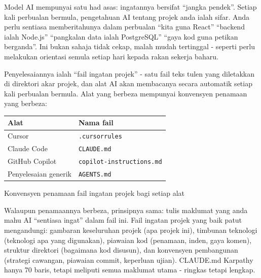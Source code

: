 


Model AI mempunyai satu had asas: ingatannya bersifat “jangka pendek”. Setiap kali perbualan bermula, pengetahuan AI tentang projek anda ialah sifar. Anda perlu sentiasa memberitahunya dalam perbualan “kita guna React” “backend ialah Node.js” “pangkalan data ialah PostgreSQL” “gaya kod guna petikan berganda”. Ini bukan sahaja tidak cekap, malah mudah tertinggal - seperti perlu melakukan orientasi semula setiap hari kepada rakan sekerja baharu.

Penyelesaiannya ialah “fail ingatan projek” - satu fail teks tulen yang diletakkan di direktori akar projek, dan alat AI akan membacanya secara automatik setiap kali perbualan bermula. Alat yang berbeza mempunyai konvensyen penamaan yang berbeza:

\begin{center}
\begin{tabularx}{\linewidth}{|X|X|}
\hline
\textbf{Alat} & \textbf{Nama fail} \tabularnewline
\hline
Cursor & \texttt{.\allowbreak cursorrules} \tabularnewline
Claude Code & \texttt{CLAUDE.\allowbreak md} \tabularnewline
GitHub Copilot & \texttt{copilot-\allowbreak instructions.\allowbreak md} \tabularnewline
Penyelesaian generik & \texttt{AGENTS.\allowbreak md} \tabularnewline
\hline
\end{tabularx}
\end{center}

\begin{center}\small\color{gray}Konvensyen penamaan fail ingatan projek bagi setiap alat\end{center}

Walaupun penamaannya berbeza, prinsipnya sama: tulis maklumat yang anda mahu AI “sentiasa ingat” dalam fail ini. Fail ingatan projek yang baik patut mengandungi: gambaran keseluruhan projek (apa projek ini), timbunan teknologi (teknologi apa yang digunakan), piawaian kod (penamaan, inden, gaya komen), struktur direktori (bagaimana kod disusun), dan konvensyen pembangunan (strategi cawangan, piawaian commit, keperluan ujian). CLAUDE.md Karpathy hanya 70 baris, tetapi meliputi semua maklumat utama - ringkas tetapi lengkap.

